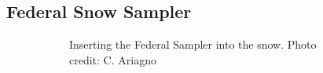 \documentclass[12pt]{article}
\begin{document}
 \subsection{Federal Snow Sampler}
\label{sec:SWE}
 
\begin{figure}
    \centering
    \begin{subfigure}[b]{0.38\textwidth}
        \caption{Inserting the Federal Sampler into the snow. Photo credit: C. Ariagno}
        \label{photo_swe1}
    \end{subfigure}
    ~
    \begin{subfigure}[b]{0.56\textwidth}

\end{subfigure}
\end{figure}
\end{document}
